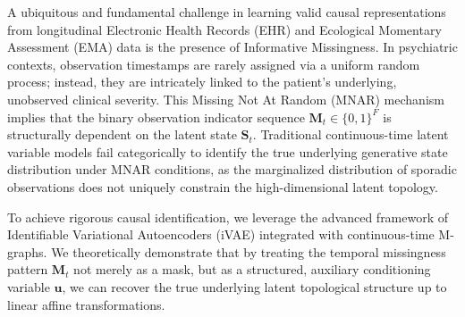 A ubiquitous and fundamental challenge in learning valid causal representations from longitudinal Electronic Health Records (EHR) and Ecological Momentary Assessment (EMA) data is the presence of Informative Missingness. In psychiatric contexts, observation timestamps are rarely assigned via a uniform random process; instead, they are intricately linked to the patient's underlying, unobserved clinical severity. This Missing Not At Random (MNAR) mechanism implies that the binary observation indicator sequence $\mathbf{M}_t \in \{0, 1\}^F$ is structurally dependent on the latent state $\mathbf{S}_t$. Traditional continuous-time latent variable models fail categorically to identify the true underlying generative state distribution under MNAR conditions, as the marginalized distribution of sporadic observations does not uniquely constrain the high-dimensional latent topology.

To achieve rigorous causal identification, we leverage the advanced framework of Identifiable Variational Autoencoders (iVAE) integrated with continuous-time M-graphs. We theoretically demonstrate that by treating the temporal missingness pattern $\mathbf{M}_t$ not merely as a mask, but as a structured, auxiliary conditioning variable $\mathbf{u}$, we can recover the true underlying latent topological structure up to linear affine transformations.

